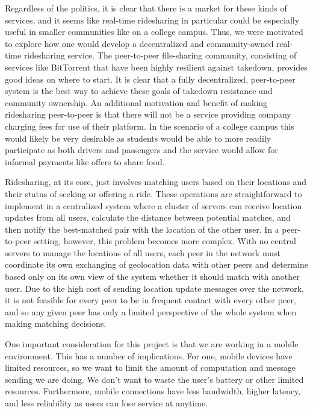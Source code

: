 \documentclass[letterpaper,11pt,twocolumn]{article}
\begin{document}
Regardless of the politics, it is clear that there is a market for these kinds of services, and it seems like real-time ridesharing in particular could be especially useful in smaller communities like on a college campus. Thus, we were motivated to explore how one would develop a decentralized and community-owned real-time ridesharing service. The peer-to-peer file-sharing community, consisting of services like BitTorrent that have been highly resilient against takedown, provides good ideas on where to start. It is clear that a fully decentralized, peer-to-peer system is the best way to achieve these goals of takedown resistance and community ownership. An additional motivation and benefit of making ridesharing peer-to-peer is that there will not be a service providing company charging fees for use of their platform. In the scenario of a college campus this would likely be very desirable as students would be able to more readily participate as both drivers and passengers and the service would allow for informal payments like offers to share food.

Ridesharing, at its core, just involves matching users based on their locations and their status of seeking or offering a ride. These operations are straightforward to implement in a centralized system where a cluster of servers can receive location updates from all users, calculate the distance between potential matches, and then notify the best-matched pair with the location of the other user. In a peer-to-peer setting, however, this problem becomes more complex. With no central servers to manage the locations of all users, each peer in the network must coordinate its own exchanging of geolocation data with other peers and determine based only on its own view of the system whether it should match with another user. Due to the high cost of sending location update messages over the network, it is not feasible for every peer to be in frequent contact with every other peer, and so any given peer has only a limited perspective of the whole system when making matching decisions.

One important consideration for this project is that we are working in a mobile environment. This has a number of implications. For one, mobile devices have limited resources, so we want to limit the amount of computation and message sending we are doing. We don't want to waste the user's battery or other limited resources. Furthermore, mobile connections have less bandwidth, higher latency, and less reliability as users can lose service at anytime.   
\end{document}
